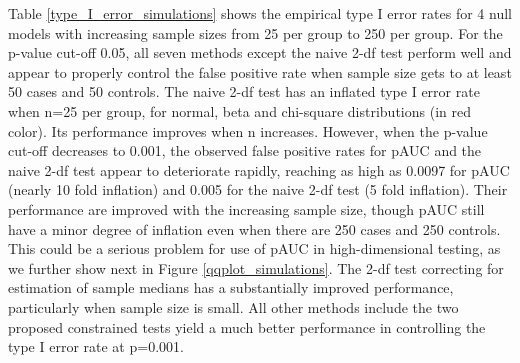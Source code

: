 \documentclass{statsoc}
\begin{document}
Table \ref{type_I_error_simulations} shows the empirical type I error rates for 4 null models with increasing sample sizes from 25 per group to 250 per group. For the p-value cut-off 0.05, all seven methods except the naive 2-df test perform well and appear to properly control the false positive rate when sample size gets to at least 50 cases and 50 controls. The naive 2-df test has an inflated type I error rate when n=25 per group, for normal, beta and chi-square distributions (in red color). Its performance improves when n increases. However, when the p-value cut-off decreases to 0.001, the observed false positive rates for pAUC and the naive 2-df test appear to deteriorate rapidly, reaching as high as 0.0097 for pAUC (nearly 10 fold inflation) and 0.005 for the naive 2-df test (5 fold inflation). Their performance are improved with the increasing sample size, though pAUC still have a minor degree of inflation even when there are 250 cases and 250 controls. This could be a serious problem for use of pAUC in high-dimensional testing, as we further show next in Figure \ref{qqplot_simulations}. The 2-df test correcting for estimation of sample medians has a substantially improved performance, particularly when sample size is small. All other methods include the two proposed constrained tests yield a much better performance in controlling the type I error rate at p=0.001.
\end{document}
